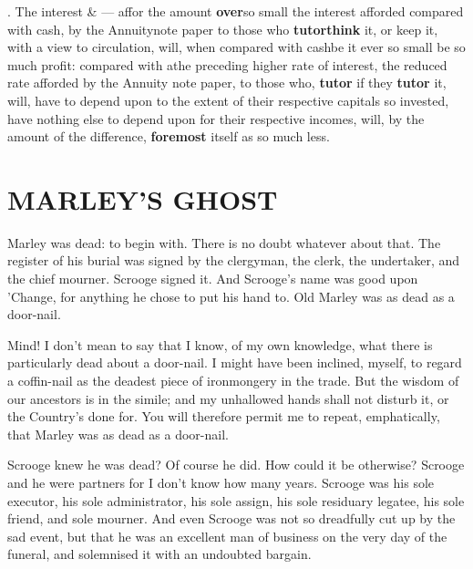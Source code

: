 \documentclass[11pt,twoside]{article}\makeatletter
\makeatletter
\renewcommand\section{\@startsection {section}{1}{\z@}%
     {-1.75ex \@plus -0.5ex \@minus -.2ex}%
     {0.5ex \@plus .2ex}%
     {\reset@font\Large\bfseries\sffamily}}
\def\DivI{\section}
\def\DivI{\chapter}
\makeatother
\begin{document}
. The {interest} & — affor  	the amount \textbf{over}{\hskip1pt}\newline  so small the interest afforded 	compared with cash,  by the Annuity{\hskip1pt}\newline  note 	paper to those who \textbf{tutor}\textbf{think} it, or keep it, with a view {\hskip1pt}\newline  	to circulation, will, when compared with cashbe it ever so small be {\hskip1pt}\newline  so much {profit}: compared with athe preceding higher {\hskip1pt}\newline  rate of interest, the reduced 	rate afforded by the Annuity {\hskip1pt}\newline  note paper, to those who, 	\textbf{tutor} if they \textbf{tutor} it, 	{\hskip1pt}\newline  will, have to depend upon to the extent of their {\hskip1pt}\newline  	respective capitals so invested, have nothing else {\hskip1pt}\newline  to depend upon for 	their respective incomes, will, by the {\hskip1pt}\newline  amount of the difference, \textbf{foremost} 	itself as so {\hskip1pt}\newline  much less.
\DivI[MARLEY'S GHOST]{MARLEY'S GHOST}\label{S1}\par
Marley was dead: to begin with.  There is no doubt whatever about that.  The register of his burial was signed by the clergyman, the clerk, the undertaker, and the chief mourner.  Scrooge signed it.  And Scrooge's name was good upon 'Change, for anything he chose to put his hand to.  Old Marley was as dead as a door-nail.  \par
Mind!  I don't mean to say that I know, of my own knowledge, what there is particularly dead about a door-nail. I might have been inclined, myself, to regard a coffin-nail as the deadest piece of ironmongery in the trade.  But the wisdom of our ancestors is in the simile; and my unhallowed  hands shall not disturb it, or the Country's done for.  You will therefore permit me to repeat, emphatically, that Marley was as dead as a door-nail.  \par
Scrooge knew he was dead?  Of course he did.  How could it be otherwise?  Scrooge and he were partners for I don't know how many years.  Scrooge was his sole executor, his sole administrator, his sole assign, his sole residuary legatee, his sole friend, and sole mourner.  And even Scrooge was not so dreadfully cut up by the sad event, but that he was an excellent man of business on the very day of the funeral, and solemnised it with an undoubted bargain.  \par
\end{document}
